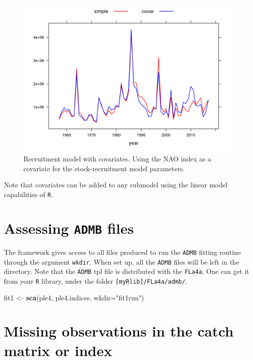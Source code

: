 \documentclass[
]{book}
\newenvironment{Shaded}{\begin{snugshade}}{\end{snugshade}}
\newcommand{\AttributeTok}[1]{\textcolor[rgb]{0.13,0.29,0.53}{#1}}
\newcommand{\FunctionTok}[1]{\textcolor[rgb]{0.13,0.29,0.53}{\textbf{#1}}}
\newcommand{\NormalTok}[1]{#1}
\newcommand{\OtherTok}[1]{\textcolor[rgb]{0.56,0.35,0.01}{#1}}
\newcommand{\StringTok}[1]{\textcolor[rgb]{0.31,0.60,0.02}{#1}}
\begin{document}
\begin{figure}
\centering
\includegraphics{_bookdown_files/_main_files/figure-html/naor2-1.png}
\caption{\label{fig:naor2}Recruitment model with covariates. Using the NAO index as a covariate for the stock-recruitment model parameters.}
\end{figure}

Note that covariates can be added to any submodel using the linear model capabilities of \texttt{R}.

\hypertarget{assessing-admb-files}{%
\section{\texorpdfstring{Assessing \texttt{ADMB} files}{Assessing ADMB files}}\label{assessing-admb-files}}

The framework gives access to all files produced to run the \texttt{ADMB} fitting routine through the argument \texttt{wkdir}. When set up, all the \texttt{ADMB} files will be left in the directory. Note that the \texttt{ADMB} tpl file is distributed with the \texttt{FLa4a}. One can get it from your \texttt{R} library, under the folder \texttt{{[}myRlib{]}/FLa4a/admb/}.

\begin{Shaded}
\begin{Highlighting}[]
\NormalTok{fit1 }\OtherTok{\textless{}{-}} \FunctionTok{sca}\NormalTok{(ple4, ple4.indices, }\AttributeTok{wkdir=}\StringTok{"fit1run"}\NormalTok{)}
\end{Highlighting}
\end{Shaded}

\hypertarget{missing-observations-in-the-catch-matrix-or-index}{%
\section{Missing observations in the catch matrix or index}\label{missing-observations-in-the-catch-matrix-or-index}}
\end{document}
